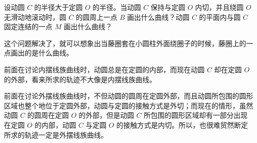 \medskip

设动圆 $C$ 的半径大于定圆 $O$ 的半径。当动圆 $C$ 保持与定圆 $O$ 内切，并且绕圆 $O$ 无滑动地滚动时，圆 $C$ 的圆周上一点 $B$ 画出什么曲线？动圆 $C$ 的平面内与圆 $C$ 固定连结的一点 $M$ 画出什么曲线？

这个问题解决了，就可以想象出当藤圈套在小圆柱外面绕圈子的时候，藤圈上的一点画出的是什么曲线。

前面在讨论内摆线族曲线时，动圆总是在定圆的内部，而现在动圆 $C$ 却在定圆 $O$ 的外部，看来所求的轨迹不大像是内摆线族曲线。

前面在讨论外摆线族曲线时，不但动圆的圆周在定圆外部，而且动圆所包围的圆形区域也整个地位于定圆外部，动圆与定圆的接触方式是外切；而现在的情形，虽然动圆 $C$ 的圆周在定圆 $O$ 的外部，但是动圆 $C$ 所包围的圆形区域却有一部分出现在定圆 $O$ 的内部，动圆 $C$ 与定圆 $O$ 的接触方式是内切。所以，也很难贸然断定所求的轨迹一定是外摆线族曲线。

